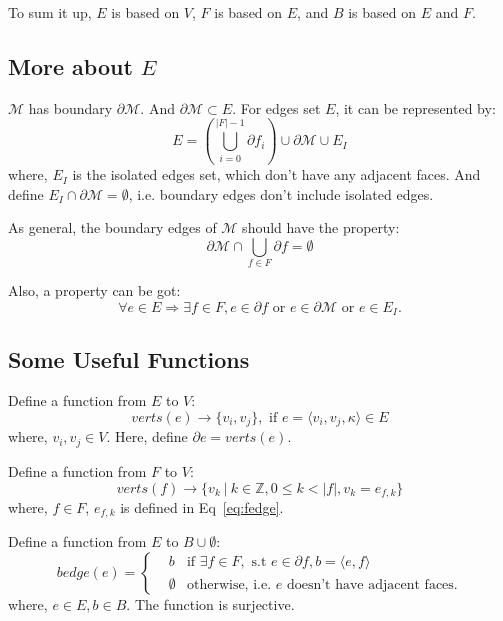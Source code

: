 \documentclass[9pt,twocolumn]{extarticle}
\begin{document}
To sum it up, $E$ is based on $V$, $F$ is based on $E$, and $B$ is based on $E$ and $F$.

\subsection{More about $E$}
$\mathcal{M}$ has boundary $\partial \mathcal{M}$. And $\partial \mathcal{M}\subset E$.
For edges set $E$, it can be represented by:
\begin{equation}
E = (\bigcup_{i=0}^{|F|-1}\partial f_i) \cup \partial \mathcal{M}\cup E_I
\end{equation}
where, $E_I$ is the isolated edges set, which don't have any adjacent faces. 
And define $E_I\cap \partial \mathcal{M}=\emptyset$, i.e. boundary edges 
don't include isolated edges.

As general, the boundary edges of $\mathcal{M}$ should have the property:
\begin{equation}
\partial \mathcal{M} \cap \bigcup_{f\in F} \partial f = \emptyset
\end{equation}

Also, a property can be got:
\begin{equation}
\forall e\in E \Rightarrow \exists f\in F, e\in \partial f \mbox{ or } e\in \partial \mathcal{M}
\mbox{ or }e\in E_I.
\end{equation}

\subsection{Some Useful Functions}

Define a function from $E$ to $V$:
\begin{equation}
verts(e)\rightarrow \{v_i,v_j\}, \mbox{ if }e=\langle v_i,v_j,\kappa \rangle \in E
\end{equation}
where, $v_i,v_j\in V$. Here, define $\partial e = verts(e)$.

Define a function from $F$ to $V$:
\begin{equation}
verts(f)\rightarrow \{v_k\ |\ k\in \mathbb{Z},
0\leq k<|f|, v_k=e_{f,k}\}
\end{equation}
where, $f\in F$, $e_{f,k}$ is defined in Eq~\ref{eq:fedge}.

Define a function from $E$ to $B\cup \emptyset$:
\begin{equation}
bedge(e)=\left \{
\begin{aligned}
&b& \mbox{if } \exists f\in F,\mbox{ s.t }
e\in \partial f, b=\langle e,f \rangle\\
&\emptyset & \mbox{otherwise, i.e. }e\mbox{ doesn't have adjacent faces.}
\end{aligned}\right.
\end{equation}
where, $e\in E, b\in B$. The function is surjective.
\end{document}

